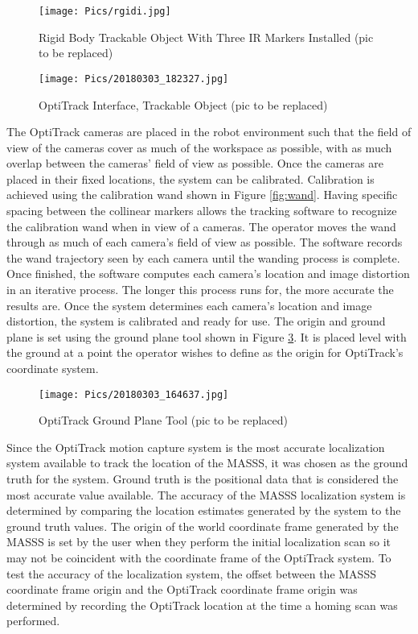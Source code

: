 \begin{figure}
    \centering
    \texttt{[image: Pics/rgidi.jpg]}
    \caption{Rigid Body Trackable Object With Three IR Markers Installed (pic to be replaced)}
    \label{fig:trackable}
\end{figure}
\begin{figure}
    \centering
    \texttt{[image: Pics/20180303\_182327.jpg]}
    \caption{OptiTrack Interface, Trackable Object (pic to be replaced)}
    \label{fig:motivetrackable}
\end{figure}

The OptiTrack cameras are placed in the robot environment such that the field of view of the cameras cover as much of the workspace as possible, with as much overlap between the cameras' field of view as possible. Once the cameras are placed in their fixed locations, the system can be calibrated. Calibration is achieved using the calibration wand shown in Figure \ref{fig:wand}. Having specific spacing between the collinear markers allows the tracking software to recognize the calibration wand when in view of a cameras. The operator moves the wand through as much of each camera's field of view as possible. The software records the wand trajectory seen by each camera until the wanding process is complete. Once finished, the software computes each camera's location and image distortion in an iterative process. The longer this process runs for, the more accurate the results are. Once the system determines each camera's location and image distortion, the system is calibrated and ready for use. The origin and ground plane is set using the ground plane tool shown in Figure \ref{fig:groundplane}. It is placed level with the ground at a point the operator wishes to define as the origin for OptiTrack's coordinate system.\\

\begin{figure}
    \centering
    \texttt{[image: Pics/20180303\_164637.jpg]}
    \caption{OptiTrack Ground Plane Tool (pic to be replaced)}
    \label{fig:groundplane}
\end{figure}

Since the OptiTrack motion capture system is the most accurate localization system available to track the location of the MASSS, it was chosen as the ground truth for the system. Ground truth is the positional data that is considered the most accurate value available. The accuracy of the MASSS localization system is determined by comparing the location estimates generated by the system to the ground truth values. The origin of the world coordinate frame generated by the MASSS is set by the user when they perform the initial localization scan so it may not be coincident with the coordinate frame of the OptiTrack system. To test the accuracy of the localization system, the offset between the MASSS coordinate frame origin and the OptiTrack coordinate frame origin was determined by recording the OptiTrack location at the time a homing scan was performed.\\


